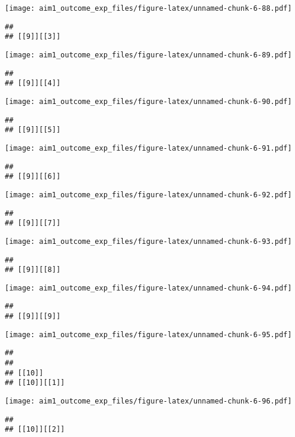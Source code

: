 \documentclass[
]{article}
\begin{document}
\texttt{[image: aim1\_outcome\_exp\_files/figure-latex/unnamed-chunk-6-88.pdf]}

\begin{verbatim}
## 
## [[9]][[3]]
\end{verbatim}

\texttt{[image: aim1\_outcome\_exp\_files/figure-latex/unnamed-chunk-6-89.pdf]}

\begin{verbatim}
## 
## [[9]][[4]]
\end{verbatim}

\texttt{[image: aim1\_outcome\_exp\_files/figure-latex/unnamed-chunk-6-90.pdf]}

\begin{verbatim}
## 
## [[9]][[5]]
\end{verbatim}

\texttt{[image: aim1\_outcome\_exp\_files/figure-latex/unnamed-chunk-6-91.pdf]}

\begin{verbatim}
## 
## [[9]][[6]]
\end{verbatim}

\texttt{[image: aim1\_outcome\_exp\_files/figure-latex/unnamed-chunk-6-92.pdf]}

\begin{verbatim}
## 
## [[9]][[7]]
\end{verbatim}

\texttt{[image: aim1\_outcome\_exp\_files/figure-latex/unnamed-chunk-6-93.pdf]}

\begin{verbatim}
## 
## [[9]][[8]]
\end{verbatim}

\texttt{[image: aim1\_outcome\_exp\_files/figure-latex/unnamed-chunk-6-94.pdf]}

\begin{verbatim}
## 
## [[9]][[9]]
\end{verbatim}

\texttt{[image: aim1\_outcome\_exp\_files/figure-latex/unnamed-chunk-6-95.pdf]}

\begin{verbatim}
## 
## 
## [[10]]
## [[10]][[1]]
\end{verbatim}

\texttt{[image: aim1\_outcome\_exp\_files/figure-latex/unnamed-chunk-6-96.pdf]}

\begin{verbatim}
## 
## [[10]][[2]]
\end{verbatim}
\end{document}
